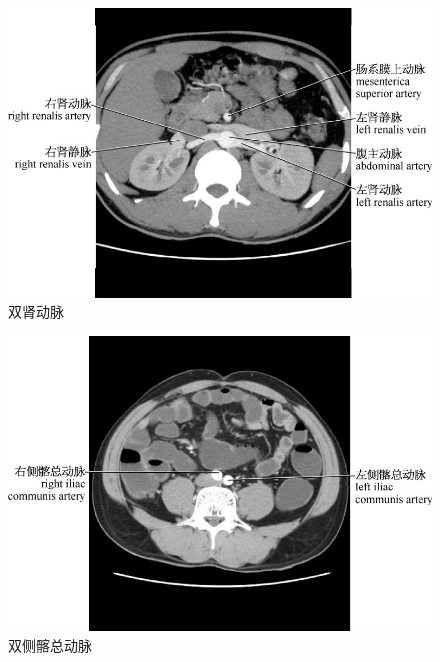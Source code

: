 \begin{figure}[!htbp]
 \centering
 \includegraphics{./images/Image00193.jpg}
 \captionsetup{justification=centering}
 \caption{双肾动脉}
  \end{figure} 
 \FloatBarrier

\begin{figure}[!htbp]
 \centering
 \includegraphics{./images/Image00194.jpg}
 \captionsetup{justification=centering}
 \caption{双侧髂总动脉}
  \end{figure} 
 \FloatBarrier

